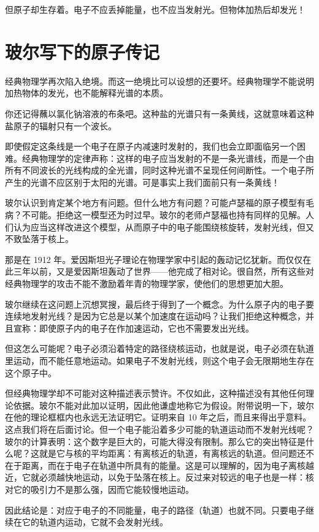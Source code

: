 但原子却生存着。电子不应丢掉能量，也不应当发射光。但物体加热后却发光！

\section{玻尔写下的原子传记}

经典物理学再次陷入绝境。而这一绝境比可以设想的还要坏。经典物理学不能说明加热物体的发光，也不能解释光谱的本质。

你还记得蘸以氯化钠溶液的布条吧。这种盐的光谱只有一条黄线，这就意味着这种盐原子的辐射只有一个波长。

即使假定这条线是一个电子在原子内减速时发射的，我们也会立即面临另一个困难。经典物理学的定律声称：这样的电子应当发射的不是一条光谱线，而是一个由所有不同波长的光线构成的全光谱，同时这种光谱不呈现任何间断性。一个电子所产生的光谱不应区别于太阳的光谱。可是事实上我们面前只有一条黄线！

玻尔认识到肯定某个地方有问题。但什么地方有问题？可能卢瑟福的原子模型有毛病？不可能。拒绝这一模型还为时过早。玻尔的老师卢瑟福也持有同样的见解。人们认为应当这样改进这个模型，从而原子中的电子能围绕核旋转，发射光线，但又不致坠落于核上。

那是在 1912 年。爱因斯坦光子理论在物理学家中引起的轰动记忆犹新。而仅仅在此三年以前，又是爱因斯坦轰动了世界——他完成了相对论。很自然，所有这些对经典物理学的攻击不能不激励着年青的物理学家，使他们的思想更加大胆。

玻尔继续在这问题上沉想冥搜，最后终于得到了一个概念。为什么原子内的电子要连续地发射光线？是因为它总是以某个加速度在运动吗？让我们拒绝这种概念，并且宣称：即使原子内的电子在作加速运动，它也不需要发出光线。

但这怎么可能呢？电子必须沿着特定的路径绕核运动，也就是说，电子必须在轨道里运动，而不能任意地运动。如果电子不发射光线，则这个电子会无限期地生存在这个原子中。

但经典物理学却不可能对这种描述表示赞许。不仅如此，这种描述没有其他任何理论依据。玻尔不能对此加以证明，因此他谦虚地称它为假设。附带说明一下，玻尔在他的理论框框内也永远无法证明它。证明来自 10 年之后，而且来得出乎意料。这点我们将在后面讨论。但一个电子能沿着多少可能的轨道运动而不发射光线呢？玻尔的计算表明：这个数字是巨大的，可能大得没有限制。那么它的突出特征是什么呢？这就是它与核的平均距离：有离核近的轨道，有离核远的轨道。但问题还不在于距离，而在于电子在轨道中所具有的能量。这是可以理解的，因为电子离核越近，它就必须越快地运动，以免于坠落在核上。反过来对较远的电子也是一样：核对它的吸引力不是那么强，因而它能较慢地运动。

因此结论是：对应于电子的不同能量，电子的路径（轨道）也就不同。只要电子继续在它的轨道内运动，它就不会发射光线。

